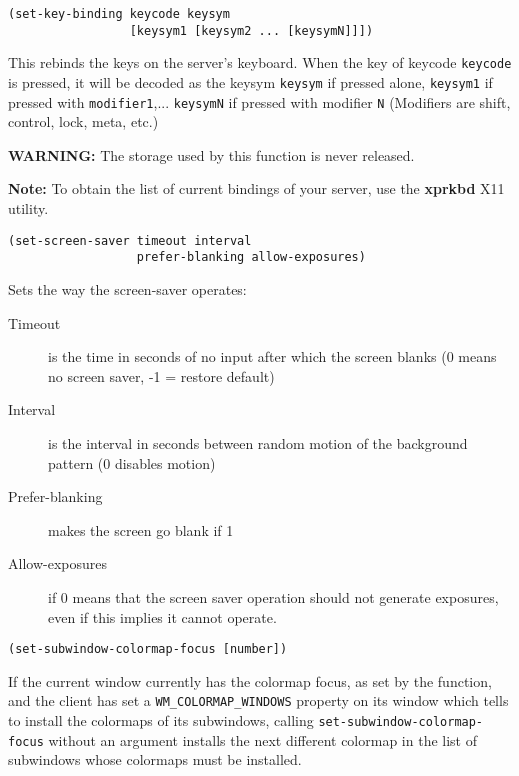 {\usagefont\begin{verbatim}
(set-key-binding keycode keysym 
                 [keysym1 [keysym2 ... [keysymN]]])
\end{verbatim}}\usageupspace

This rebinds the keys on the server's keyboard. When the key of keycode
\verb"keycode" is pressed, it will be decoded as the keysym
\verb"keysym" if pressed alone, \verb"keysym1" if pressed with
\verb"modifier1",...  \verb"keysymN" if pressed with modifier {\tt N}
(Modifiers are shift, control, lock, meta, etc.)

{\bf WARNING:} The storage used by this function is never released.

{\bf Note:} To obtain the list of current bindings of your server, use the
{\bf xprkbd} X11 utility.

        
{\usagefont\begin{verbatim}
(set-screen-saver timeout interval 
                  prefer-blanking allow-exposures)
\end{verbatim}}\usageupspace

Sets the way the screen-saver operates:

\begin{description}

\item[Timeout] is the time in seconds of no input after which the screen blanks
                (0 means no screen saver, -1 = restore default)
\item[Interval] is the interval in seconds between random motion of the background
                pattern (0 disables motion)
\item[Prefer-blanking] makes the screen go blank if 1
\item[Allow-exposures] if 0 means that the screen saver operation should not
                generate exposures, even if this implies it cannot operate.
\end{description}


{\usagefont\begin{verbatim}
(set-subwindow-colormap-focus [number])
\end{verbatim}}\usageupspace

If the current window currently has the colormap focus, as set
by the  function, and the client has set a
\verb"WM_COLORMAP_WINDOWS" property on its window which tells 
{\GWM} to install
the colormaps of its subwindows, calling \verb"set-subwindow-colormap-focus"
without an argument installs the next different colormap in the list of
subwindows whose colormaps must be installed.

